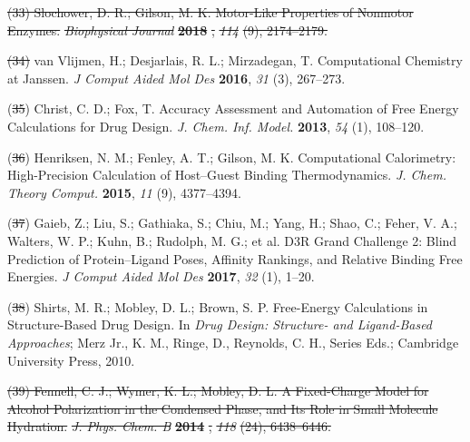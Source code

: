 \documentclass[11pt,notitlepage]{article}
\providecommand{\DIFaddtex}[1]{{\protect\color{blue}\uwave{#1}}} %
\providecommand{\DIFdeltex}[1]{{\protect\color{red}\sout{#1}}}                      %
\providecommand{\DIFaddbegin}{} %
\providecommand{\DIFaddend}{} %
\providecommand{\DIFdelbegin}{} %
\providecommand{\DIFdelend}{} %
\providecommand{\DIFadd}[1]{\texorpdfstring{\DIFaddtex{#1}}{#1}} %
\providecommand{\DIFdel}[1]{\texorpdfstring{\DIFdeltex{#1}}{}} %
\newcommand{\DIFscaledelfig}{0.5}
\newlength{\DIFdelgraphicswidth} %
\newlength{\DIFdelgraphicsheight} %
\newcommand{\DIFaddincludegraphics}[2][]{{\color{blue}\fbox{\DIFOincludegraphics[#1]{#2}}}} %
\newcommand{\DIFdelincludegraphics}[2][]{%
\sbox{\DIFdelgraphicsbox}{\DIFOincludegraphics[#1]{#2}}%
\settoboxwidth{\DIFdelgraphicswidth}{\DIFdelgraphicsbox} %
\settoboxtotalheight{\DIFdelgraphicsheight}{\DIFdelgraphicsbox} %
\scalebox{\DIFscaledelfig}{%
\parbox[b]{\DIFdelgraphicswidth}{\usebox{\DIFdelgraphicsbox}\\[-\baselineskip] \rule{\DIFdelgraphicswidth}{0em}}\llap{\resizebox{\DIFdelgraphicswidth}{\DIFdelgraphicsheight}{%
\setlength{\unitlength}{\DIFdelgraphicswidth}%
\begin{picture}(1,1)%
\thicklines\linethickness{2pt} %
{\color[rgb]{1,0,0}\put(0,0){\framebox(1,1){}}}%
{\color[rgb]{1,0,0}\put(0,0){\line( 1,1){1}}}%
{\color[rgb]{1,0,0}\put(0,1){\line(1,-1){1}}}%
\end{picture}%
}\hspace*{3pt}}} %
} %
\DeclareRobustCommand{\DIFaddbegin}{\DIFOaddbegin \let\includegraphics\DIFaddincludegraphics} %
\DeclareRobustCommand{\DIFaddend}{\DIFOaddend \let\includegraphics\DIFOincludegraphics} %
\DeclareRobustCommand{\DIFdelbegin}{\DIFOdelbegin \let\includegraphics\DIFdelincludegraphics} %
\DeclareRobustCommand{\DIFdelend}{\DIFOaddend \let\includegraphics\DIFOincludegraphics} %
\begin{document}
\DIFdel{(33) Slochower, D. R.; Gilson, M. K. Motor-Like Properties of Nonmotor
Enzymes. }\emph{\DIFdel{Biophysical Journal}} %
\textbf{\DIFdel{2018}}%
\DIFdel{, }\emph{\DIFdel{114}} %
\DIFdel{(9),
2174--2179.
}%

\DIFdel{(34) }\DIFdelend van Vlijmen, H.; Desjarlais, R. L.; Mirzadegan, T. Computational
Chemistry at Janssen. \emph{J Comput Aided Mol Des} \textbf{2016},
\emph{31} (3), 267--273.

\leavevmode\hypertarget{ref-1BwXH3GFO}{}%
(\DIFdelbegin \DIFdel{35}\DIFdelend \DIFaddbegin \DIFadd{32}\DIFaddend ) Christ, C. D.; Fox, T. Accuracy Assessment and Automation of Free
Energy Calculations for Drug Design. \emph{J. Chem. Inf. Model.}
\textbf{2013}, \emph{54} (1), 108--120.

\leavevmode\hypertarget{ref-1935a9V0d}{}%
(\DIFdelbegin \DIFdel{36}\DIFdelend \DIFaddbegin \DIFadd{33}\DIFaddend ) Henriksen, N. M.; Fenley, A. T.; Gilson, M. K. Computational
Calorimetry: High-Precision Calculation of Host--Guest Binding
Thermodynamics. \emph{J. Chem. Theory Comput.} \textbf{2015}, \emph{11}
(9), 4377--4394.

\leavevmode\hypertarget{ref-LWd10vQy}{}%
(\DIFdelbegin \DIFdel{37}\DIFdelend \DIFaddbegin \DIFadd{34}\DIFaddend ) Gaieb, Z.; Liu, S.; Gathiaka, S.; Chiu, M.; Yang, H.; Shao, C.;
Feher, V. A.; Walters, W. P.; Kuhn, B.; Rudolph, M. G.; et al. D3R Grand
Challenge 2: Blind Prediction of Protein--Ligand Poses, Affinity
Rankings, and Relative Binding Free Energies. \emph{J Comput Aided Mol
Des} \textbf{2017}, \emph{32} (1), 1--20.

\leavevmode\hypertarget{ref-fC0t6Cy1}{}%
(\DIFdelbegin \DIFdel{38}\DIFdelend \DIFaddbegin \DIFadd{35}\DIFaddend ) Shirts, M. R.; Mobley, D. L.; Brown, S. P. Free-Energy Calculations
in Structure-Based Drug Design. In \emph{Drug Design: Structure- and
Ligand-Based Approaches}; Merz Jr., K. M., Ringe, D., Reynolds, C. H.,
Series Eds.; Cambridge University Press, 2010.

\leavevmode\DIFdelbegin %
\DIFdel{(39) Fennell, C. J.; Wymer, K. L.; Mobley, D. L. A Fixed-Charge Model
for Alcohol Polarization in the Condensed Phase, and Its Role in Small
Molecule Hydration. }\emph{\DIFdel{J. Phys. Chem. B}} %
\textbf{\DIFdel{2014}}%
\DIFdel{, }\emph{\DIFdel{118}}
\DIFdel{(24), 6438--6446.
}%
\end{document}
